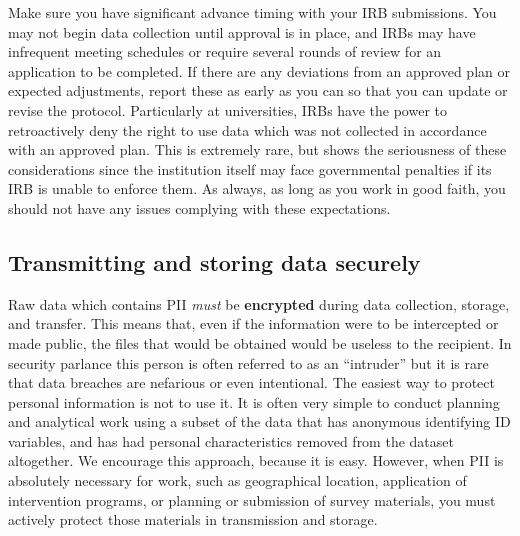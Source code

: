 Make sure you have significant advance timing with your IRB submissions.
You may not begin data collection until approval is in place,
and IRBs may have infrequent meeting schedules
or require several rounds of review for an application to be completed.
If there are any deviations from an approved plan or expected adjustments,
report these as early as you can so that you can update or revise the protocol.
Particularly at universities, IRBs have the power to retroactively deny
the right to use data which was not collected in accordance with an approved plan.
This is extremely rare, but shows the seriousness of these considerations
since the institution itself may face governmental penalties if its IRB
is unable to enforce them. As always, as long as you work in good faith,
you should not have any issues complying with these expectations.

\subsection{Transmitting and storing data securely}

Raw data which contains PII \textit{must} be \textbf{encrypted}
during data collection, storage, and transfer.
This means that, even if the information were to be intercepted or made public,
the files that would be obtained would be useless to the recipient.
In security parlance this person is often referred to as an ``intruder''
but it is rare that data breaches are nefarious or even intentional.
The easiest way to protect personal information is not to use it.
It is often very simple to conduct planning and analytical work
using a subset of the data that has anonymous identifying ID variables,
and has had personal characteristics removed from the dataset altogether.
We encourage this approach, because it is easy.
However, when PII is absolutely necessary for work,
such as geographical location, application of intervention programs,
or planning or submission of survey materials,
you must actively protect those materials in transmission and storage.

